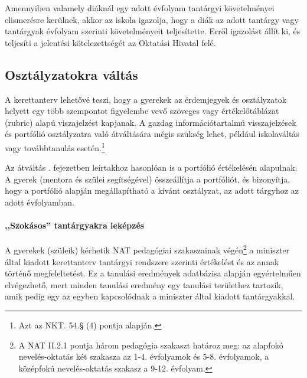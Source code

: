Amennyiben valamely diáknál egy adott évfolyam tantárgyi követelményei
elismerésre kerülnek, akkor az iskola igazolja, hogy a diák az adott tantárgy
vagy tantárgyak évfolyam szerinti követelményeit teljesítette.
Erről igazolást állít ki, és teljesíti a jelentési kötelezettségét az Oktatási
Hivatal felé.

\subsection{Osztályzatokra váltás}
\label{sec:osztalyzatok}
A kerettanterv lehetővé teszi, hogy a gyerekek az érdemjegyek
és osztályzatok
helyett egy több szempontot figyelembe vevő szöveges vagy értékelőtáblázat
(rubric) alapú viszajelzést kapjanak.
A gazdag információtartalmú visszajelzések és portfólió osztályzatra való
átváltására mégis szükség lehet, például iskolaváltás vagy továbbtanulás
esetén.\footnote{Azt az NKT. 54.§ (4) pontja alapján.}

Az átváltás .
fejezetben leírtakhoz
hasonlóan is a portfólió értékelésén alapulnak.
A gyerek (mentora és szülei segítségével) összeállítja a portfóliót, és
bizonyítja, hogy a portfólió alapján megállapítható a kívánt osztályzat, az
adott tárgyhoz az adott évfolyamban.

\paragraph{,,Szokásos'' tantárgyakra leképzés}
A gyerekek (szüleik) kérhetik NAT pedagógiai szakaszainak
végén\footnote{A NAT II.2.1 pontja három pedagógia szakaszt határoz meg: az
      alapfokó nevelés-oktatás két szakasza az 1-4. évfolyamok és 5-8.
      évfolyamok,
      a középfokú nevelés-oktatás szakasz a 9-12. évfolyam.}
a miniszter
által kiadott kerettanterv tantárgyi rendszere szerinti értékelést és az annak
történő megfeleltetést. Ez a tanulási eredmények adatbázisa alapján
egyértelműen elvégezhető, mert minden tanulási eredmény egy tanulási területhez
tartozik, amik pedig egy az egyben kapcsolódnak a miniszter által kiadott
tantárgyakkal.
